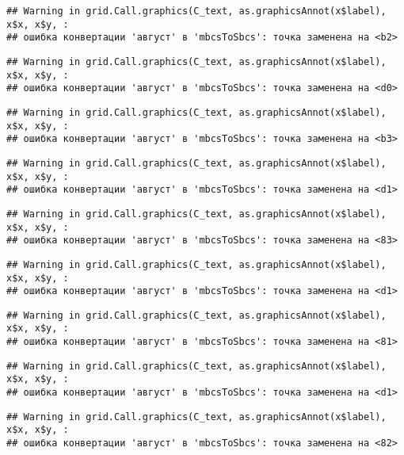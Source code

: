 \documentclass[
]{article}
\begin{document}
\begin{verbatim}
## Warning in grid.Call.graphics(C_text, as.graphicsAnnot(x$label), x$x, x$y, :
## ошибка конвертации 'август' в 'mbcsToSbcs': точка заменена на <b2>
\end{verbatim}

\begin{verbatim}
## Warning in grid.Call.graphics(C_text, as.graphicsAnnot(x$label), x$x, x$y, :
## ошибка конвертации 'август' в 'mbcsToSbcs': точка заменена на <d0>
\end{verbatim}

\begin{verbatim}
## Warning in grid.Call.graphics(C_text, as.graphicsAnnot(x$label), x$x, x$y, :
## ошибка конвертации 'август' в 'mbcsToSbcs': точка заменена на <b3>
\end{verbatim}

\begin{verbatim}
## Warning in grid.Call.graphics(C_text, as.graphicsAnnot(x$label), x$x, x$y, :
## ошибка конвертации 'август' в 'mbcsToSbcs': точка заменена на <d1>
\end{verbatim}

\begin{verbatim}
## Warning in grid.Call.graphics(C_text, as.graphicsAnnot(x$label), x$x, x$y, :
## ошибка конвертации 'август' в 'mbcsToSbcs': точка заменена на <83>
\end{verbatim}

\begin{verbatim}
## Warning in grid.Call.graphics(C_text, as.graphicsAnnot(x$label), x$x, x$y, :
## ошибка конвертации 'август' в 'mbcsToSbcs': точка заменена на <d1>
\end{verbatim}

\begin{verbatim}
## Warning in grid.Call.graphics(C_text, as.graphicsAnnot(x$label), x$x, x$y, :
## ошибка конвертации 'август' в 'mbcsToSbcs': точка заменена на <81>
\end{verbatim}

\begin{verbatim}
## Warning in grid.Call.graphics(C_text, as.graphicsAnnot(x$label), x$x, x$y, :
## ошибка конвертации 'август' в 'mbcsToSbcs': точка заменена на <d1>
\end{verbatim}

\begin{verbatim}
## Warning in grid.Call.graphics(C_text, as.graphicsAnnot(x$label), x$x, x$y, :
## ошибка конвертации 'август' в 'mbcsToSbcs': точка заменена на <82>
\end{verbatim}
\end{document}
